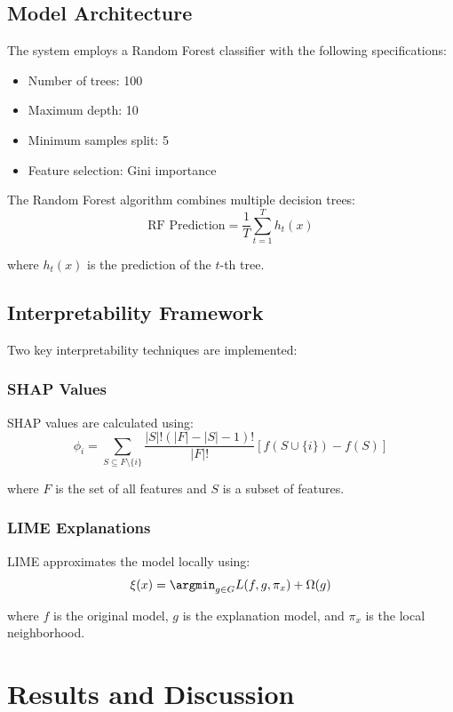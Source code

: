 \documentclass[conference]{IEEEtran}
\begin{document}
\subsection{Model Architecture}
The system employs a Random Forest classifier with the following specifications:
\begin{itemize}
    \item Number of trees: 100
    \item Maximum depth: 10
    \item Minimum samples split: 5
    \item Feature selection: Gini importance
\end{itemize}

The Random Forest algorithm combines multiple decision trees:
\begin{equation}
    \text{RF Prediction} = \frac{1}{T} \sum_{t=1}^T h_t(x)
\end{equation}

where $h_t(x)$ is the prediction of the $t$-th tree.

\subsection{Interpretability Framework}
Two key interpretability techniques are implemented:

\subsubsection{SHAP Values}
SHAP values are calculated using:
\begin{equation}
    \phi_i = \sum_{S \subseteq F \setminus \{i\}} \frac{|S|!(|F|-|S|-1)!}{|F|!}[f(S \cup \{i\}) - f(S)]
\end{equation}

where $F$ is the set of all features and $S$ is a subset of features.

\subsubsection{LIME Explanations}
LIME approximates the model locally using:
\begin{equation}
    \xi(x) = \argmin_{g \in G} L(f,g,\pi_x) + \Omega(g)
\end{equation}

where $f$ is the original model, $g$ is the explanation model, and $\pi_x$ is the local neighborhood.

\section{Results and Discussion}
\end{document}
